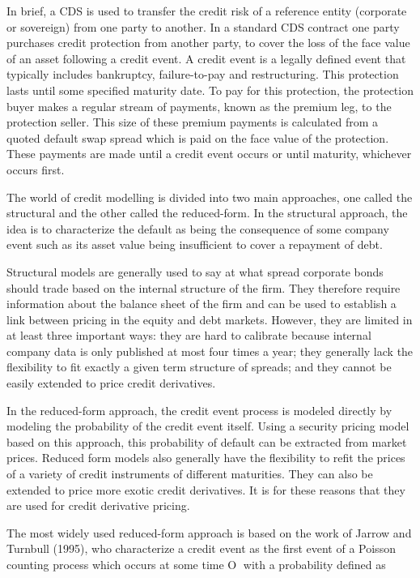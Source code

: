 \documentclass[a4paper]{book}
\begin{document}
%
\begin{Details}\relax
In brief, a CDS is used to transfer the credit risk of a reference entity (corporate or sovereign) from one party to another. In a standard CDS contract one party purchases credit protection from another party, to cover the loss of the face value of an asset following a credit event. A credit event is a
legally defined event that typically includes bankruptcy, failure-to-pay and restructuring. This protection lasts until some specified maturity date. To pay for this protection, the protection buyer makes a regular stream of payments, known as the premium leg, to the protection seller. This size of these premium payments is calculated from a quoted default swap spread which is paid on the face value of the protection. These payments are made until a credit event occurs or until maturity, whichever occurs first.

The world of credit modelling is divided into two main approaches, one called the structural and the other called the reduced-form. In the structural approach, the idea is to characterize the default as being the consequence of some company event such as its asset value being insufficient to cover a repayment of debt.

Structural models are generally used to say at what spread corporate bonds should trade based on the internal structure of the firm. They therefore require information about the balance sheet of the firm and can be used to establish a link between pricing in the equity and debt markets. However, they are limited 
in at least three important ways: they are hard to calibrate because internal company data is only published at most four times a year; they generally lack the flexibility to fit exactly a given term structure of spreads; and they cannot be easily extended to price credit derivatives.

In the reduced-form approach, the credit event process is modeled directly by modeling the probability of the credit event itself. Using a security pricing model based on this approach, this probability of default can be extracted from market prices. Reduced form models also generally have the flexibility to refit the prices of a variety of credit instruments of different maturities. They can also be extended to price more exotic credit derivatives. It is for these reasons that they are used for credit derivative pricing.

The most widely used reduced-form approach is based on the work of Jarrow and Turnbull (1995), who characterize a credit event as the first event of a Poisson counting process which occurs at some time O with a probability defined as


\end{Details}
\end{document}
